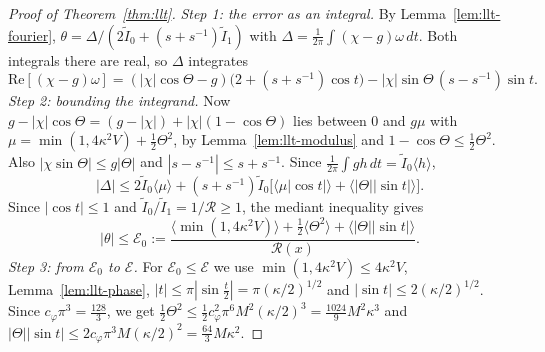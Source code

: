 \begin{proof}[Proof of Theorem~\ref{thm:llt}]
\emph{Step 1: the error as an integral.} By Lemma~\ref{lem:llt-fourier}, $\theta=\Delta/(2\tilde I_0+(s+s^{-1})\tilde I_1)$ with
$\Delta=\frac1{2\pi}\int(\chi-g)\omega\,dt$. Both integrals there are real, so $\Delta$ integrates
\[
\mathrm{Re}[(\chi-g)\omega]=(|\chi|\cos\Theta-g)\bigl(2+(s+s^{-1})\cos t\bigr)
-|\chi|\sin\Theta\,(s-s^{-1})\sin t .
\]
\emph{Step 2: bounding the integrand.} Now
$g-|\chi|\cos\Theta=(g-|\chi|)+|\chi|(1-\cos\Theta)$ lies between $0$ and
$g\mu$ with
$\mu=\min(1,4\kappa^2V)+\frac12\Theta^2$, by Lemma~\ref{lem:llt-modulus} and
$1-\cos\Theta\le\frac12\Theta^2$. Also
$|\chi\sin\Theta|\le g|\Theta|$ and $|s-s^{-1}|\le s+s^{-1}$. Since
$\frac1{2\pi}\int gh\,dt=\tilde I_0\langle h\rangle$,
\[
|\Delta|\le2\tilde I_0\langle\mu\rangle+(s+s^{-1})\tilde I_0\bigl[\langle\mu|\cos t|\rangle
+\langle|\Theta||\sin t|\rangle\bigr].
\]
Since $|\cos t|\le1$ and $\tilde I_0/\tilde I_1=1/\mathcal R\ge1$, the mediant inequality gives
\[
|\theta|\le\mathcal E_0:=\frac{\langle\min(1,4\kappa^2V)\rangle+\frac12\langle\Theta^2\rangle
+\langle|\Theta||\sin t|\rangle}{\mathcal R(x)}.
\]
\emph{Step 3: from $\mathcal E_0$ to $\mathcal E$.} For
$\mathcal E_0\le\mathcal E$ we use $\min(1,4\kappa^2V)\le4\kappa^2V$,
Lemma~\ref{lem:llt-phase}, $|t|\le\pi|\sin\frac t2|=\pi(\kappa/2)^{1/2}$ and
$|\sin t|\le2(\kappa/2)^{1/2}$. Since $c_\varphi\pi^3=\frac{128}3$, we get
$\frac12\Theta^2\le\frac12c_\varphi^2\pi^6M^2(\kappa/2)^3=\frac{1024}9M^2\kappa^3$ and
$|\Theta||\sin t|\le2c_\varphi\pi^3M(\kappa/2)^2=\frac{64}3M\kappa^2$.
\end{proof}

